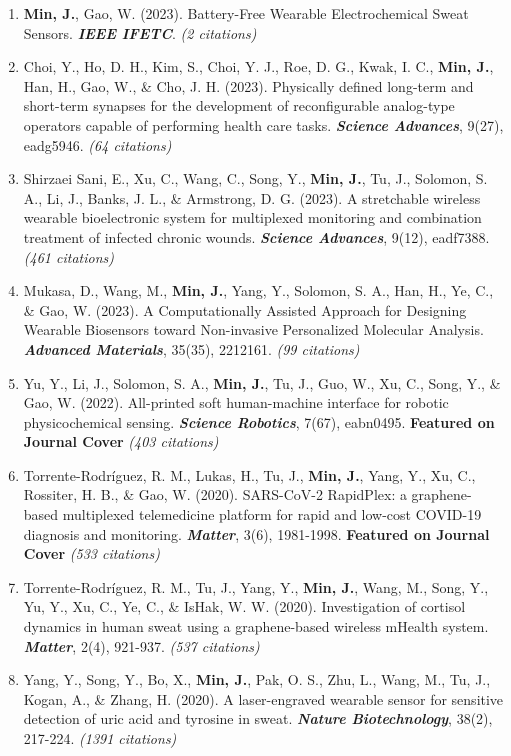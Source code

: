 \documentclass[11pt,a4paper]{article}
\begin{document}
\begin{enumerate}[leftmargin=*, itemsep=3pt, parsep=0pt, topsep=2pt]
  \item \textbf{Min, J.}, Gao, W. (2023). Battery-Free Wearable Electrochemical Sweat Sensors. \textbf{\textit{IEEE IFETC}}. \textit{(2 citations)}
  \item Choi, Y., Ho, D. H., Kim, S., Choi, Y. J., Roe, D. G., Kwak, I. C., \textbf{Min, J.}, Han, H., Gao, W., \& Cho, J. H. (2023). Physically defined long-term and short-term synapses for the development of reconfigurable analog-type operators capable of performing health care tasks. \textbf{\textit{Science Advances}}, 9(27), eadg5946. \textit{(64 citations)}
  \item Shirzaei Sani, E., Xu, C., Wang, C., Song, Y., \textbf{Min, J.}, Tu, J., Solomon, S. A., Li, J., Banks, J. L., \& Armstrong, D. G. (2023). A stretchable wireless wearable bioelectronic system for multiplexed monitoring and combination treatment of infected chronic wounds. \textbf{\textit{Science Advances}}, 9(12), eadf7388. \textit{(461 citations)}
  \item Mukasa, D., Wang, M., \textbf{Min, J.}, Yang, Y., Solomon, S. A., Han, H., Ye, C., \& Gao, W. (2023). A Computationally Assisted Approach for Designing Wearable Biosensors toward Non-invasive Personalized Molecular Analysis. \textbf{\textit{Advanced Materials}}, 35(35), 2212161. \textit{(99 citations)}
  \item Yu, Y., Li, J., Solomon, S. A., \textbf{Min, J.}, Tu, J., Guo, W., Xu, C., Song, Y., \& Gao, W. (2022). All-printed soft human-machine interface for robotic physicochemical sensing. \textbf{\textit{Science Robotics}}, 7(67), eabn0495. \textbf{Featured on Journal Cover} \textit{(403 citations)}
  \item Torrente-Rodríguez, R. M., Lukas, H., Tu, J., \textbf{Min, J.}, Yang, Y., Xu, C., Rossiter, H. B., \& Gao, W. (2020). SARS-CoV-2 RapidPlex: a graphene-based multiplexed telemedicine platform for rapid and low-cost COVID-19 diagnosis and monitoring. \textbf{\textit{Matter}}, 3(6), 1981-1998. \textbf{Featured on Journal Cover} \textit{(533 citations)}
  \item Torrente-Rodríguez, R. M., Tu, J., Yang, Y., \textbf{Min, J.}, Wang, M., Song, Y., Yu, Y., Xu, C., Ye, C., \& IsHak, W. W. (2020). Investigation of cortisol dynamics in human sweat using a graphene-based wireless mHealth system. \textbf{\textit{Matter}}, 2(4), 921-937. \textit{(537 citations)}
  \item Yang, Y., Song, Y., Bo, X., \textbf{Min, J.}, Pak, O. S., Zhu, L., Wang, M., Tu, J., Kogan, A., \& Zhang, H. (2020). A laser-engraved wearable sensor for sensitive detection of uric acid and tyrosine in sweat. \textbf{\textit{Nature Biotechnology}}, 38(2), 217-224. \textit{(1391 citations)}

\end{enumerate}
\end{document}
